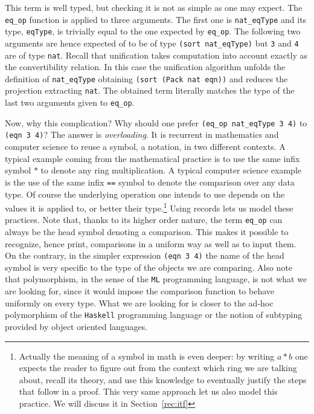 This term is well typed, but checking it is not as simple as one may
expect.
The \lstinline/eq_op/ function is applied to three arguments.
The first one is \lstinline/nat_eqType/ and its type,
\lstinline/eqType/, is trivially equal to the one expected by
\lstinline/eq_op/.
The following two arguments are hence expected of to be of type
\lstinline/(sort nat_eqType)/ but \lstinline/3/ and \lstinline/4/ are
of type \lstinline/nat/.
Recall that unification takes computation into account exactly as the
convertibility relation.  In this case the unification algorithm
unfolds the definition of \lstinline/nat_eqType/ obtaining
\lstinline/(sort (Pack nat eqn))/ and reduces the projection
extracting  \lstinline/nat/.  The obtained term literally matches the
type of the last two arguments given to \lstinline/eq_op/.

Now, why this complication?  Why should one prefer
\lstinline/(eq_op nat_eqType 3 4)/ to \lstinline/(eqn 3 4)/?
The answer is \emph{overloading}.
It is recurrent in mathematics and computer science to reuse
a symbol, a notation, in two different contexts.  A typical
example coming from the mathematical practice is to use the same
infix symbol $*$ to denote any ring multiplication.  A typical
computer science example is the use of the same infix
\lstinline/==/ symbol to denote the comparison over any data type.
Of course the underlying operation one intends to use depends on
the values it is applied to, or better their type.\footnote{
Actually the meaning of a symbol in math is even deeper: by writing $a
* b$ one expects the reader to figure out from the context which ring
we are talking about, recall its theory, and use this knowledge to
eventually justify the steps that follow in a proof.  This very
same approach let us also model this practice.  We will discuss
it in Section~\ref{rec:itf}}
Using records lets us model these practices.
Note that, thanks to its higher order nature, the term \lstinline/eq_op/
can always be the head symbol denoting a comparison.  This makes
it possible to recognize, hence print, comparisons in a uniform way
as well as to input them.  On the contrary, in the simpler expression
\lstinline/(eqn 3 4)/ the name of the head symbol is very specific to
the type of the objects we are comparing.  Also note that
polymorphism, in the sense of the \lstinline/ML/ programming language,
is not what we are looking for, since it would impose the comparison
function to behave uniformly on every type.  What we are looking
for is closer to the ad-hoc polymorphism of the \lstinline/Haskell/
programming language or the notion of subtyping provided by object
oriented languages.

